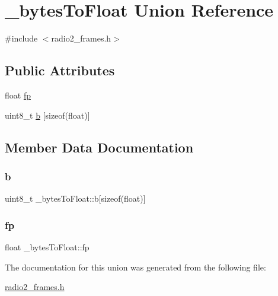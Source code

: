 \hypertarget{union__bytes_to_float}{}\section{\+\_\+bytes\+To\+Float Union Reference}
\label{union__bytes_to_float}


{\ttfamily \#include $<$radio2\+\_\+frames.\+h$>$}

\subsection*{Public Attributes}
\begin{DoxyCompactItemize}
\item 
float \mbox{\hyperlink{union__bytes_to_float_af563c90a17cc80f433a07ce3557c3cb4}{fp}}
\item 
uint8\+\_\+t \mbox{\hyperlink{union__bytes_to_float_a4261b0d6b9eb0eafa2ac813f93f84e5a}{b}} \mbox{[}sizeof(float)\mbox{]}
\end{DoxyCompactItemize}


\subsection{Member Data Documentation}
\mbox{\label{union__bytes_to_float_a4261b0d6b9eb0eafa2ac813f93f84e5a}} 
\subsubsection{\texorpdfstring{b}{b}}
{\footnotesize\ttfamily uint8\+\_\+t \+\_\+bytes\+To\+Float\+::b\mbox{[}sizeof(float)\mbox{]}}

\mbox{\label{union__bytes_to_float_af563c90a17cc80f433a07ce3557c3cb4}} 
\subsubsection{\texorpdfstring{fp}{fp}}
{\footnotesize\ttfamily float \+\_\+bytes\+To\+Float\+::fp}



The documentation for this union was generated from the following file\+:\begin{DoxyCompactItemize}
\item 
\mbox{\hyperlink{radio2__frames_8h}{radio2\+\_\+frames.\+h}}\end{DoxyCompactItemize}
